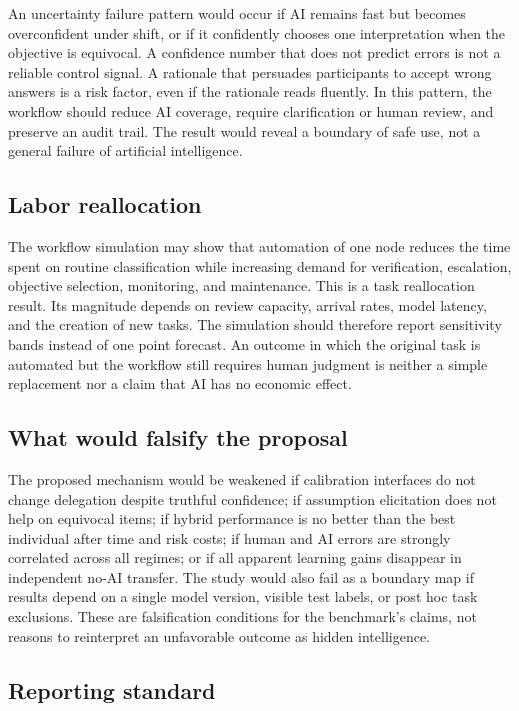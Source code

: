 \documentclass[conference]{IEEEtran}
\begin{document}
An uncertainty failure pattern would occur if AI remains fast but becomes overconfident under shift, or if it confidently chooses one interpretation when the objective is equivocal. A confidence number that does not predict errors is not a reliable control signal. A rationale that persuades participants to accept wrong answers is a risk factor, even if the rationale reads fluently. In this pattern, the workflow should reduce AI coverage, require clarification or human review, and preserve an audit trail. The result would reveal a boundary of safe use, not a general failure of artificial intelligence.

\subsection{Labor reallocation}

The workflow simulation may show that automation of one node reduces the time spent on routine classification while increasing demand for verification, escalation, objective selection, monitoring, and maintenance. This is a task reallocation result. Its magnitude depends on review capacity, arrival rates, model latency, and the creation of new tasks. The simulation should therefore report sensitivity bands instead of one point forecast. An outcome in which the original task is automated but the workflow still requires human judgment is neither a simple replacement nor a claim that AI has no economic effect.

\subsection{What would falsify the proposal}

The proposed mechanism would be weakened if calibration interfaces do not change delegation despite truthful confidence; if assumption elicitation does not help on equivocal items; if hybrid performance is no better than the best individual after time and risk costs; if human and AI errors are strongly correlated across all regimes; or if all apparent learning gains disappear in independent no-AI transfer. The study would also fail as a boundary map if results depend on a single model version, visible test labels, or post hoc task exclusions. These are falsification conditions for the benchmark's claims, not reasons to reinterpret an unfavorable outcome as hidden intelligence.

\subsection{Reporting standard}
\end{document}
